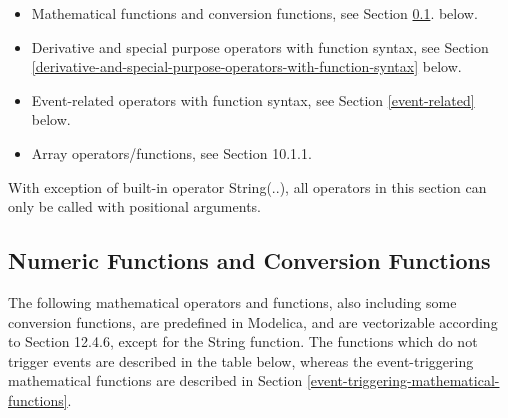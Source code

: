 \documentclass[10pt,a4paper]{report}
\def\doublelabel#1{\label{#1}\hypertarget{#1}{}}
\begin{document}
\begin{itemize}
\item
  Mathematical functions and conversion functions, see Section \ref{numeric-functions-and-conversion-functions}.
  below.
\end{itemize}

\begin{itemize}
\item
  Derivative and special purpose operators with function syntax, see
  Section \ref{derivative-and-special-purpose-operators-with-function-syntax} below.
\item
  Event-related operators with function syntax, see Section \ref{event-related}
  below.
\item
  Array operators/functions, see Section 10.1.1.
\end{itemize}

With exception of built-in operator String(..), all operators in this
section can only be called with positional arguments.

\subsection{Numeric Functions and Conversion Functions}\doublelabel{numeric-functions-and-conversion-functions}

The following mathematical operators and functions, also including some
conversion functions, are predefined in Modelica, and are vectorizable
according to Section 12.4.6, except for the String function. The
functions which do not trigger events are described in the table below,
whereas the event-triggering mathematical functions are described in
Section \ref{event-triggering-mathematical-functions}.
\end{document}
